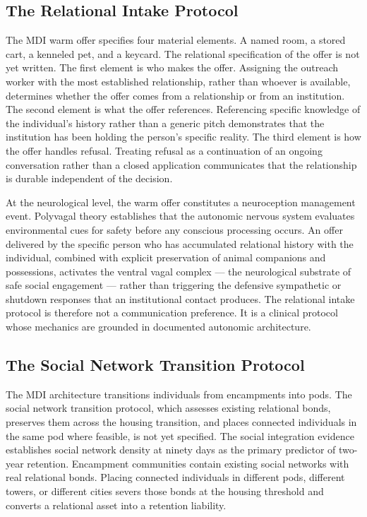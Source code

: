 \documentclass[12pt, letterpaper]{article}
\begin{document}
\subsection{The Relational Intake Protocol}

The MDI warm offer specifies four material elements. A named room, a stored cart, a kenneled pet, and a keycard. The relational specification of the offer is not yet written. The first element is who makes the offer. Assigning the outreach worker with the most established relationship, rather than whoever is available, determines whether the offer comes from a relationship or from an institution. The second element is what the offer references. Referencing specific knowledge of the individual's history rather than a generic pitch demonstrates that the institution has been holding the person's specific reality. The third element is how the offer handles refusal. Treating refusal as a continuation of an ongoing conversation rather than a closed application communicates that the relationship is durable independent of the decision.

At the neurological level, the warm offer constitutes a neuroception management event. Polyvagal theory establishes that the autonomic nervous system evaluates environmental cues for safety before any conscious processing occurs. An offer delivered by the specific person who has accumulated relational history with the individual, combined with explicit preservation of animal companions and possessions, activates the ventral vagal complex --- the neurological substrate of safe social engagement --- rather than triggering the defensive sympathetic or shutdown responses that an institutional contact produces. The relational intake protocol is therefore not a communication preference. It is a clinical protocol whose mechanics are grounded in documented autonomic architecture.

\subsection{The Social Network Transition Protocol}

The MDI architecture transitions individuals from encampments into pods. The social network transition protocol, which assesses existing relational bonds, preserves them across the housing transition, and places connected individuals in the same pod where feasible, is not yet specified. The social integration evidence establishes social network density at ninety days as the primary predictor of two-year retention. Encampment communities contain existing social networks with real relational bonds. Placing connected individuals in different pods, different towers, or different cities severs those bonds at the housing threshold and converts a relational asset into a retention liability.
\end{document}

